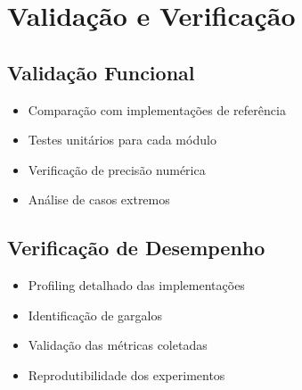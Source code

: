 \section{Validação e Verificação}\label{sec:validacao}

\subsection{Validação Funcional}
\begin{itemize}
    \item Comparação com implementações de referência
    \item Testes unitários para cada módulo
    \item Verificação de precisão numérica
    \item Análise de casos extremos
\end{itemize}

\subsection{Verificação de Desempenho}
\begin{itemize}
    \item Profiling detalhado das implementações
    \item Identificação de gargalos
    \item Validação das métricas coletadas
    \item Reprodutibilidade dos experimentos
\end{itemize}

